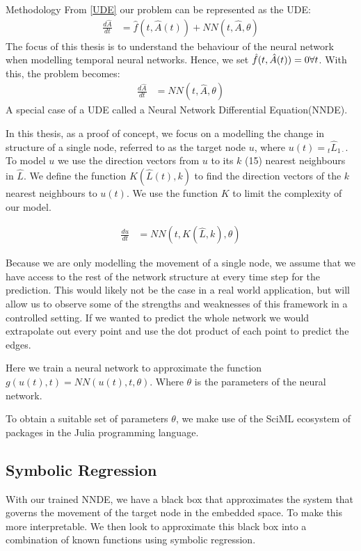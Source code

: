 \documentclass[12pt]{amsart}
\begin{document}
\begin{section}{Methodology}
        From \autoref{UDE} our problem can be represented as the UDE:
        \begin{align}
            \frac{d \hat A}{dt} &= \hat f(t,\hat A(t)) + NN(t, \hat A, \theta)
        \end{align}
        The focus of this thesis is to understand the behaviour of the neural network when modelling temporal neural networks. Hence, we set $\hat f(t, \hat A(t))=0 \space \forall t$. With this, the problem becomes:
        \begin{align}
            \frac{d \hat A}{dt} &= NN(t, \hat A, \theta)
        \end{align}
        A special case of a UDE called a Neural Network Differential Equation(NNDE).

        In this thesis, as a proof of concept, we focus on a modelling the change in structure of a single node, referred to as the target node $u$, where $u(t)={_t}\hat L_{1\cdot}$. To model $u$ we use the direction vectors from $u$ to its $k$ (15) nearest neighbours in $\hat L$. We define the function $K(\hat L(t), k)$ to find the direction vectors of the $k$ nearest neighbours to $u(t)$. We use the function $K$ to limit the complexity of our model.

        \begin{align}
            \frac{du}{dt} &= NN(t, K(\hat L, k), \theta)
        \end{align}

        Because we are only modelling the movement of a single node, we assume that we have access to the rest of the network structure at every time step for the prediction. This would likely not be the case in a real world application, but will allow us to observe some of the strengths and weaknesses of this framework in a controlled setting. If we wanted to predict the whole network we would extrapolate out every point and use the dot product of each point to predict the edges.
        
        Here we train a neural network to approximate the function $g(u(t),t)=NN(u(t),t,\theta)$. Where $\theta$ is the parameters of the neural network.

        
        To obtain a suitable set of parameters $\theta$, we make use of the SciML ecosystem of packages in the Julia programming language\cite{SciML_C_Rak}.    


    
    \subsection{Symbolic Regression}
        With our trained NNDE, we have a black box that approximates the system that governs the movement of the target node in the embedded space. To make this more interpretable. We then look to approximate this black box into a combination of known functions using symbolic regression\cite{pysr}.
        

\end{section}
\end{document}

